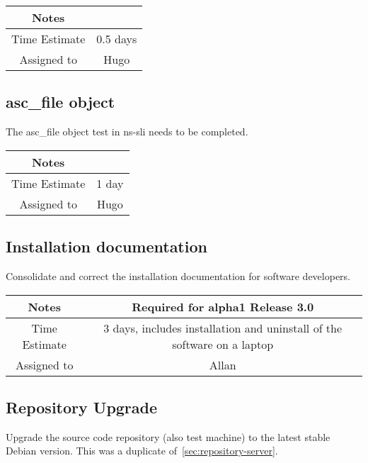 \documentclass[12pt]{article}
\begin{document}
{
  \vspace{5mm}
  \centering
  \begin{tabular}{|c|c|}
    \hline
    Notes
    & \\
    \hline
    Time Estimate
    & 0.5 days \\
    \hline
    Assigned to
    & Hugo \\
    \hline
  \end{tabular}
}


\subsection{asc\_file object}

The asc\_file object test in ns-sli needs to be completed.

{
  \vspace{5mm}
  \centering
  \begin{tabular}{|c|c|}
    \hline
    Notes
    & \\
    \hline
    Time Estimate
    & 1 day \\
    \hline
    Assigned to
    & Hugo \\
    \hline
  \end{tabular}
}


\subsection{Installation documentation}

Consolidate and correct the installation documentation for software
developers.

{
  \vspace{5mm}
  \centering
  \begin{tabular}{|c|c|}
    \hline
    Notes
    & Required for alpha1 Release 3.0 \\
    \hline
    Time Estimate
    & 3 days, includes installation and uninstall of the software on a laptop \\
    \hline
    Assigned to
    & Allan \\
    \hline
  \end{tabular}
}


\subsection{Repository Upgrade}

Upgrade the source code repository (also test machine) to the latest
stable Debian version.  This was a duplicate
of~\ref{sec:repository-server}.
\end{document}
